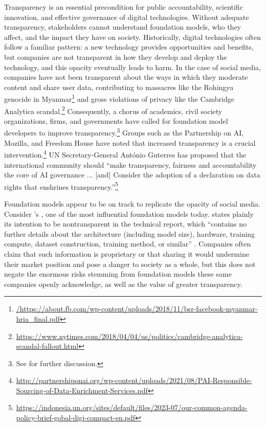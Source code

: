 Transparency is an essential precondition for public accountability, scientific innovation, and effective governance of digital technologies.
Without adequate transparency, stakeholders cannot understand foundation models, who they affect, and the impact they have on society.
Historically, digital technologies often follow a familiar pattern: a new technology provides opportunities and benefits, but companies are not transparent in how they develop and deploy the technology, and this opacity eventually leads to harm. 
In the case of social media, companies have not been transparent about the ways in which they moderate content and share user data, contributing to massacres like the Rohingya genocide in Myanmar\footnote{\url{/https://about.fb.com/wp-content/uploads/2018/11/bsr-facebook-myanmar-hria_final.pdf}} and gross violations of privacy like the Cambridge Analytica scandal.\footnote{\url{https://www.nytimes.com/2018/04/04/us/politics/cambridge-analytica-scandal-fallout.html}}
Consequently, a chorus of academics, civil society organizations, firms, and governments have called for foundation model developers to improve transparency.\footnote{See  for further discussion.} 
Groups such as the Partnership on AI, Mozilla, and Freedom House have noted that increased transparency is a crucial intervention.\footnote{\url{http://partnershiponai.org/wp-content/uploads/2021/08/PAI-Responsible-Sourcing-of-Data-Enrichment-Services.pdf}}
UN Secretary-General António Guterres has proposed that the international community should “make transparency, fairness and accountability the core of AI governance ... [and] Consider the adoption of a declaration on data rights that enshrines transparency.”\footnote{\url{https://indonesia.un.org/sites/default/files/2023-07/our-common-agenda-policy-brief-gobal-digi-compact-en.pdf}} 

Foundation models appear to be on track to replicate the opacity of social media. 
Consider \openai's \gptfour, one of the most influential foundation models today. 
\openai states plainly its intention to be nontransparent in the \gptfour technical report, which “contains no further details about the architecture (including model size), hardware, training compute, dataset construction, training method, or similar” \citep{openai2023gpt4}. 
Companies often claim that such information is proprietary or that sharing it would undermine their market position and pose a danger to society as a whole, but this does not negate the enormous risks stemming from foundation models these same companies openly acknowledge, as well as the value of greater transparency. 

